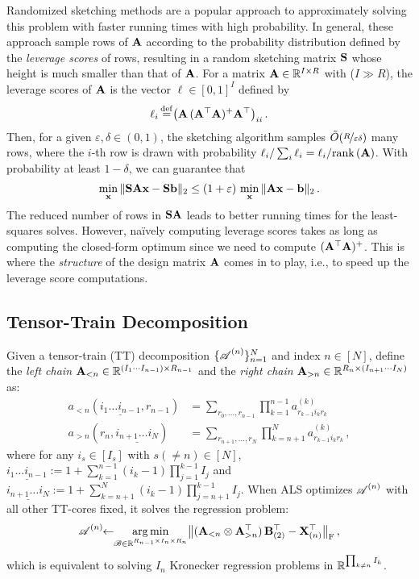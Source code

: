Randomized sketching methods are a popular approach to approximately solving this problem with faster running times with high probability.
In general, these approach sample rows of $\mathbf{A}$ according to the probability distribution defined by the \emph{leverage scores} of rows, resulting in a random sketching matrix $\mathbf{S}$ whose height is much smaller than that of $\mathbf{A}$. For a matrix $\mathbf{A} \in \mathbb{R}^{I\times R}$ with ($I\gg R$), the leverage scores of $\mathbf{A}$ is the vector $\ell\in [0,1]^I$ defined by
\[
\ell_i \operatorname*{\overset{def}{=}} \bigl(\mathbf{A}\,(\mathbf{A^\top A})^+\mathbf{A}^\top\bigr)_{ii}\,.
\]
Then, for a given $\varepsilon, \delta \in (0,1)$, the sketching algorithm samples $\tilde{O}(\nicefrac{R}{\varepsilon\delta})$ many rows, where the $i$-th row is drawn with probability $\ell_i  / \sum_i \ell_i = \ell_i / \text{rank}\,(\mathbf{A})$.
With probability at least $1-\delta$, we can guarantee that
\[
\min_{\mathbf{x}} \,\lVert\mathbf{S}\mathbf{A}\mathbf{x}-\mathbf{S}\mathbf{b}\rVert_2 \leq (1+\varepsilon)\, \min_{\mathbf{x}}\,\lVert\mathbf{A}\mathbf{x} - \mathbf{b}\rVert_2\,.
\]
The reduced number of rows in $\mathbf{SA}$ leads to better running times for the least-squares solves.
However, na\"ively computing leverage scores takes as long as computing the closed-form optimum since we need to compute $(\mathbf{A}^\top \mathbf{A})^{+}$.
This is where the \emph{structure} of the design matrix $\mathbf{A}$ comes in to play, i.e., to speed up the leverage score computations.


\subsection{Tensor-Train Decomposition}
\label{app:tt-decomposition-details}

Given a tensor-train (TT) decomposition $\{\bm{\mathscr{A}}^{(n)}\}_{n=1}^{N}$ and index $n\in[N]$, define the
\emph{left chain} $\mathbf{A}_{<n} \in \mathbb{R}^{(I_1 \cdots I_{n-1}) \times R_{n-1}}$
and
the \emph{right chain} $\mathbf{A}_{> n}\in \mathbb{R}^{R_n \times (I_{n+1} \cdots I_N)}$ as:
\begin{align*}
    a_{< n}(\underline{i_1\dots i_{n-1}}, r_{n-1})
    &=
    \sum_{r_0,\dots,r_{n-1}} \prod_{k=1}^{n-1} a^{(k)}_{r_{k-1}i_kr_k}
    \\
    a_{> n}(r_n, \underline{i_{n+1}\dots i_N})
    &=
    \sum_{r_{n+1},\dots,r_N} \prod_{k=n+1}^N a^{(k)}_{r_{k-1}i_kr_k}\,,
\end{align*}
where for any $i_s \in [I_s]$ with $s (\neq n)\in [N]$, $\underline{i_1\dots i_{n-1}}:= 1+ \sum_{k=1}^{n-1} (i_k -1)\prod_{j=1}^{k-1} I_j$ and $\underline{i_{n+1}\dots i_N}:= 1+ \sum_{k=n+1}^{N} (i_k -1)\prod_{j=n+1}^{k-1} I_j$.
When ALS optimizes $\bm{\mathscr{A}}^{(n)}$ with all other TT-cores fixed, it solves the regression problem:
\[
    \bm{\mathscr{A}}^{(n)} \!\!
    \gets \!\!
    \operatorname*{arg\,min}_{\bm{\mathscr{B}} \in \mathbb{R}^{R_{n-1}\times I_n \times R_n}}
    \bigl\lVert (\mathbf{A}_{<n}\otimes \mathbf{A}^\top_{>n})\,\mathbf{B}_{(2)}^\top - \mathbf{X}_{(n)}^\top \bigr\rVert_{\textnormal{F}}\,,
\]
which is equivalent to solving $I_n$ Kronecker regression problems in $\mathbb{R}^{\prod_{k\neq n} I_k}$.


